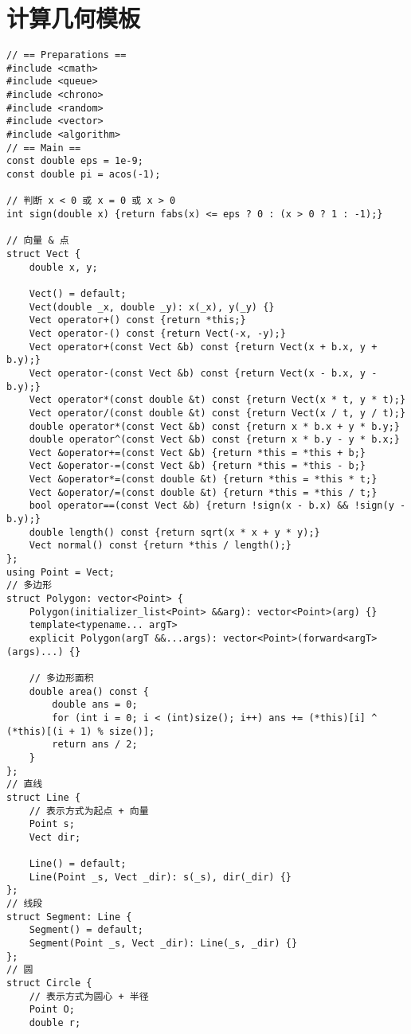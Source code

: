\section{计算几何模板}

\begin{verbatim}
// == Preparations ==
#include <cmath>
#include <queue>
#include <chrono>
#include <random>
#include <vector>
#include <algorithm>
// == Main ==
const double eps = 1e-9;
const double pi = acos(-1);

// 判断 x < 0 或 x = 0 或 x > 0
int sign(double x) {return fabs(x) <= eps ? 0 : (x > 0 ? 1 : -1);}

// 向量 & 点
struct Vect {
    double x, y;

    Vect() = default;
    Vect(double _x, double _y): x(_x), y(_y) {}
    Vect operator+() const {return *this;}
    Vect operator-() const {return Vect(-x, -y);}
    Vect operator+(const Vect &b) const {return Vect(x + b.x, y + b.y);}
    Vect operator-(const Vect &b) const {return Vect(x - b.x, y - b.y);}
    Vect operator*(const double &t) const {return Vect(x * t, y * t);}
    Vect operator/(const double &t) const {return Vect(x / t, y / t);}
    double operator*(const Vect &b) const {return x * b.x + y * b.y;}
    double operator^(const Vect &b) const {return x * b.y - y * b.x;}
    Vect &operator+=(const Vect &b) {return *this = *this + b;}
    Vect &operator-=(const Vect &b) {return *this = *this - b;}
    Vect &operator*=(const double &t) {return *this = *this * t;}
    Vect &operator/=(const double &t) {return *this = *this / t;}
    bool operator==(const Vect &b) {return !sign(x - b.x) && !sign(y - b.y);}
    double length() const {return sqrt(x * x + y * y);}
    Vect normal() const {return *this / length();}
};
using Point = Vect;
// 多边形
struct Polygon: vector<Point> {
    Polygon(initializer_list<Point> &&arg): vector<Point>(arg) {}
    template<typename... argT>
    explicit Polygon(argT &&...args): vector<Point>(forward<argT>(args)...) {}

    // 多边形面积
    double area() const {
        double ans = 0;
        for (int i = 0; i < (int)size(); i++) ans += (*this)[i] ^ (*this)[(i + 1) % size()];
        return ans / 2;
    }
};
// 直线
struct Line {
    // 表示方式为起点 + 向量
    Point s;
    Vect dir;

    Line() = default;
    Line(Point _s, Vect _dir): s(_s), dir(_dir) {}
};
// 线段
struct Segment: Line {
    Segment() = default;
    Segment(Point _s, Vect _dir): Line(_s, _dir) {}
};
// 圆
struct Circle {
    // 表示方式为圆心 + 半径
    Point O;
    double r;


\end{verbatim}
